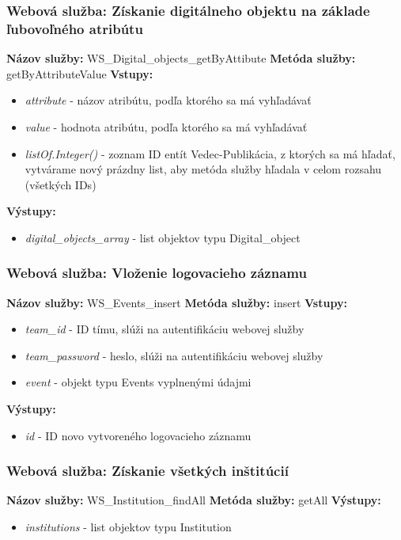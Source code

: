 \documentclass[10pt,oneside,slovak,a4paper]{article}
\begin{document}
\subsubsection{Webová služba: Získanie digitálneho objektu na základe ľubovoľného atribútu}
\textbf{Názov služby:} WS\_Digital\_objects\_getByAttibute
\textbf{Metóda služby:} getByAttributeValue
\textbf{Vstupy:}
	\begin{itemize}
		\item \textit{attribute} - názov atribútu, podľa ktorého sa má vyhľadávať
		\item \textit{value} - hodnota atribútu, podľa ktorého sa má vyhľadávať
		\item \textit{listOf.Integer()} - zoznam ID entít Vedec-Publikácia, z ktorých sa má hľadať, vytvárame nový prázdny list, aby metóda služby hľadala v celom rozsahu (všetkých IDs)
	\end{itemize}
\textbf{Výstupy:}
	\begin{itemize}
		\item \textit{digital\_objects\_array} - list objektov typu Digital\_object
	\end{itemize}
	
\subsubsection{Webová služba: Vloženie logovacieho záznamu}
\textbf{Názov služby:} WS\_Events\_insert
\textbf{Metóda služby:} insert
\textbf{Vstupy:}
	\begin{itemize}
		\item \textit{team\_id} - ID tímu, slúži na autentifikáciu webovej služby
		\item \textit{team\_password} - heslo, slúži na autentifikáciu webovej služby
		\item \textit{event} - objekt typu Events vyplnenými údajmi
	\end{itemize}
\textbf{Výstupy:}
	\begin{itemize}
		\item \textit{id} - ID novo vytvoreného logovacieho záznamu
	\end{itemize}
	
\subsubsection{Webová služba: Získanie všetkých inštitúcií}
\textbf{Názov služby:} WS\_Institution\_findAll
\textbf{Metóda služby:} getAll
\textbf{Výstupy:}
	\begin{itemize}
		\item \textit{institutions} - list objektov typu Institution
	\end{itemize}
	
\end{document}
